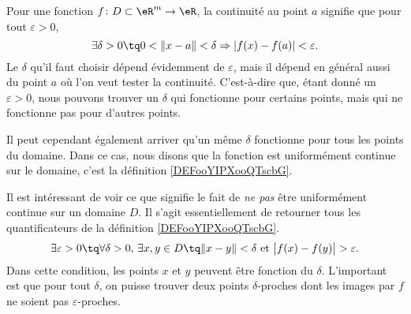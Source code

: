 Pour une fonction \( f\colon D\subset\eR^m\to \eR\), la continuité au point \( a\) signifie que pour tout \( \varepsilon>0\),
\begin{equation}
	\exists\delta>0\tq 0<\| x-a \|<\delta\Rightarrow | f(x)-f(a) |<\varepsilon.
\end{equation}
Le \( \delta\) qu'il faut choisir dépend évidemment de \( \varepsilon\), mais il dépend en général aussi du point \( a\) où l'on veut tester la continuité. C'est-à-dire que, étant donné un \( \varepsilon>0\), nous pouvons trouver un \( \delta\) qui fonctionne pour certains points, mais qui ne fonctionne pas pour d'autres points.

Il peut cependant également arriver qu'un même \( \delta\) fonctionne pour tous les points du domaine. Dans ce cas, nous disons que la fonction est uniformément continue sur le domaine, c'est la définition \ref{DEFooYIPXooQTscbG}.

Il est intéressant de voir ce que signifie le fait de \emph{ne pas} être uniformément continue sur un domaine \( D\). Il s'agit essentiellement de retourner tous les quantificateurs de la définition \ref{DEFooYIPXooQTscbG}.
\begin{equation}	\label{EqConditionPasUnifCont}
	\exists\varepsilon>0\tq\forall\delta>0,\,\exists x,y\in D\tq \| x-y \|<\delta\text{ et }\big| f(x)-f(y) \big|>\varepsilon.
\end{equation}
Dans cette condition, les points \( x\) et \( y\) peuvent être fonction du \( \delta\). L'important est que pour tout \( \delta\), on puisse trouver deux points \( \delta\)-proches dont les images par \( f\) ne soient pas \( \varepsilon\)-proches.

